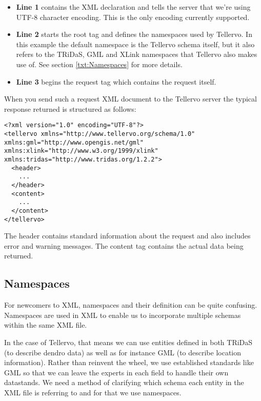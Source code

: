 \begin{itemize}
 \item \textbf{Line 1} contains the XML declaration and tells the server that we're using UTF-8 character encoding.  This is the only encoding currently supported.
 \item \textbf{Line 2} starts the root tag and defines the namespaces used by Tellervo.  In this example the default namespace is the Tellervo schema itself, but it also refers to the TRiDaS, GML and XLink namespaces that Tellervo also makes use of. See section \ref{txt:Namespaces} for more details.
 \item \textbf{Line 3} begins the request tag which contains the request itself. 
\end{itemize}

When you send such a request XML document to the Tellervo server the typical response returned is structured as follows:

\begin{lstlisting}
<?xml version="1.0" encoding="UTF-8"?>
<tellervo xmlns="http://www.tellervo.org/schema/1.0" xmlns:gml="http://www.opengis.net/gml" xmlns:xlink="http://www.w3.org/1999/xlink" xmlns:tridas="http://www.tridas.org/1.2.2">
  <header>
    ...
  </header>
  <content>
    ...
  </content>
</tellervo>
\end{lstlisting}

The header contains standard information about the request and also includes error and warning messages.  The content tag contains the actual data being returned.

\subsection{Namespaces}
\label{txt:Namespaces}

For newcomers to XML, namespaces and their definition can be quite confusing. Namespaces are used in XML to enable us to incorporate multiple schemas within the same XML file.  

In the case of Tellervo, that means we can use entities defined in both TRiDaS (to describe dendro data) as well as for instance GML (to describe location information).  Rather than reinvent the wheel, we use established standards like GML so that we can leave the experts in each field to handle their own datastands.  We need a method of clarifying which schema each entity in the XML file is referring to and for that we use namespaces.  

